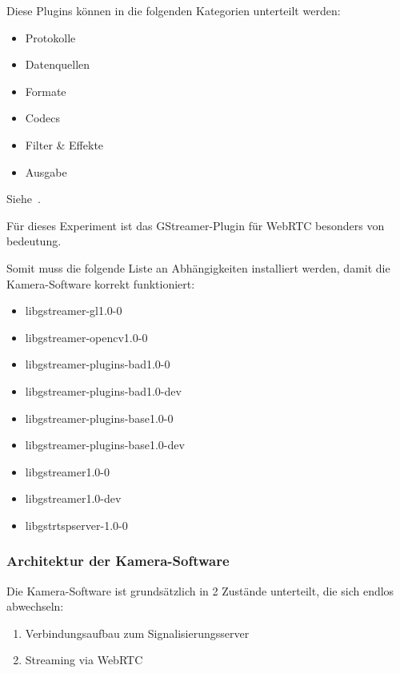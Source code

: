 \documentclass{article}
\begin{document}
\begin{onecolumn}
Diese Plugins können in die folgenden Kategorien unterteilt werden:

\begin{itemize}
	\item Protokolle
	\item Datenquellen
	\item Formate
	\item Codecs
	\item Filter \& Effekte
	\item Ausgabe
\end{itemize}

Siehe~\cite{GStreamerManualIntro}.


Für dieses Experiment ist das GStreamer-Plugin für WebRTC besonders von
bedeutung.

Somit muss die folgende Liste an Abhängigkeiten installiert werden, damit die
Kamera-Software korrekt funktioniert:

\begin{itemize}
	\item libgstreamer-gl1.0-0
	\item libgstreamer-opencv1.0-0
	\item libgstreamer-plugins-bad1.0-0
	\item libgstreamer-plugins-bad1.0-dev
	\item libgstreamer-plugins-base1.0-0
	\item libgstreamer-plugins-base1.0-dev
	\item libgstreamer1.0-0
	\item libgstreamer1.0-dev
	\item libgstrtspserver-1.0-0
\end{itemize}

\subsubsection{Architektur der Kamera-Software}

Die Kamera-Software ist grundsätzlich in 2 Zustände unterteilt, die sich endlos
abwechseln:

\begin{enumerate}
	\item Verbindungsaufbau zum Signalisierungsserver
	\item Streaming via WebRTC
\end{enumerate}


\end{onecolumn}
\end{document}
